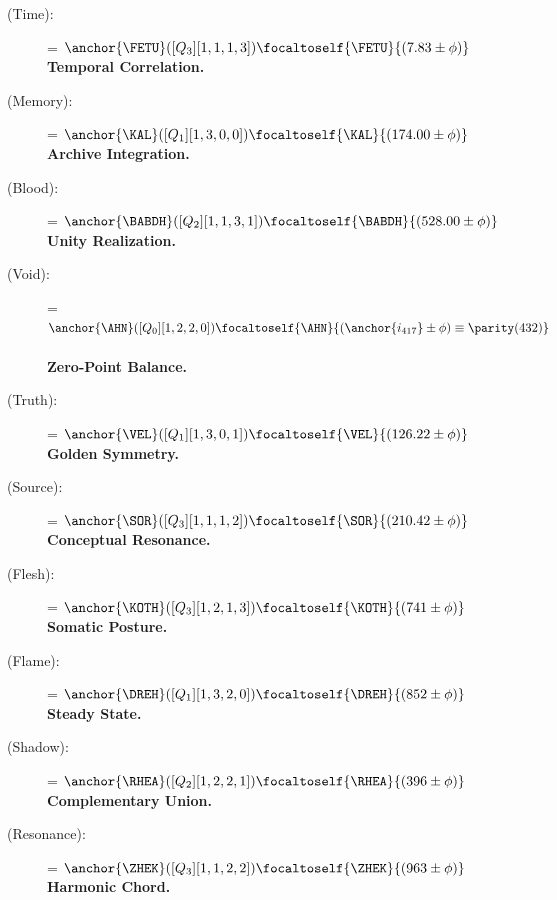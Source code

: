 \begin{description}
    \item[\FETU{} (Time):] \fetufurh = $\anchor{\FETU}([Q_3][1,1,1,3]) \focaltoself{\FETU}{(7.83 \pm \phi)}$\, \\
    \textbf{Temporal Correlation.}

    \item[\KAL{} (Memory):] \kalper = $\anchor{\KAL}([Q_1][1,3,0,0]) \focaltoself{\KAL}{(174.00 \pm \phi)}$\, \\
    \textbf{Archive Integration.}

    \item[\BABDH{} (Blood):] \babdhbon = $\anchor{\BABDH}([Q_2][1,1,3,1]) \focaltoself{\BABDH}{(528.00 \pm \phi)}$\, \\
    \textbf{Unity Realization.}

    \item[\AHN{} (Void):] \ahnfae = $\anchor{\AHN}([Q_0][1,2,2,0]) \focaltoself{\AHN}{(\anchor{i_{417}} \pm \phi) \equiv \parity(432)}$\, \\
    \textbf{Zero-Point Balance.}

    \item[\VEL{} (Truth):] \velqel = $\anchor{\VEL}([Q_1][1,3,0,1]) \focaltoself{\VEL}{(126.22 \pm \phi)}$\, \\
    \textbf{Golden Symmetry.}

    \item[\SOR{} (Source):] \sorhrin = $\anchor{\SOR}([Q_3][1,1,1,2]) \focaltoself{\SOR}{(210.42 \pm \phi)}$\, \\
    \textbf{Conceptual Resonance.}

    \item[\KOTH{} (Flesh):] \kothsoth = $\anchor{\KOTH}([Q_3][1,2,1,3]) \focaltoself{\KOTH}{(741 \pm \phi)}$\, \\
    \textbf{Somatic Posture.}

    \item[\DREH{} (Flame):] \drehoth = $\anchor{\DREH}([Q_1][1,3,2,0]) \focaltoself{\DREH}{(852 \pm \phi)}$\, \\
    \textbf{Steady State.}

    \item[\RHEA{} (Shadow):] \rheakol = $\anchor{\RHEA}([Q_2][1,2,2,1]) \focaltoself{\RHEA}{(396 \pm \phi)}$\, \\
    \textbf{Complementary Union.}

    \item[\ZHEK{} (Resonance):] \zheklokh = $\anchor{\ZHEK}([Q_3][1,1,2,2]) \focaltoself{\ZHEK}{(963 \pm \phi)}$\, \\
    \textbf{Harmonic Chord.}


\end{description}
